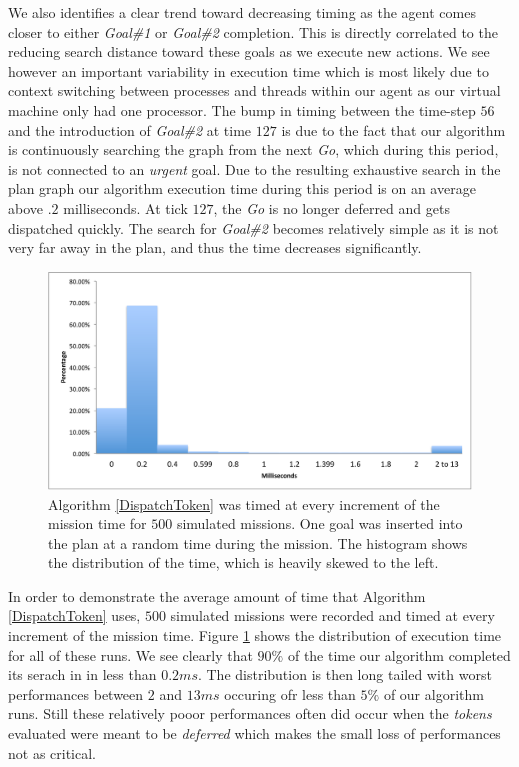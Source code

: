 We also identifies a clear trend toward decreasing timing as 
the agent comes closer to either {\em Goal\#1} or {\em Goal\#2} 
completion. This is directly correlated to the reducing search
distance toward these goals as we execute new actions. 
We see however an important variability in execution time which is
most likely due to context switching between processes and threads 
within our agent as our virtual machine only had one processor. 
The bump in timing between the time-step $56$ and the introduction of
{\em Goal\#2} at time $127$ is due to the fact that our algorithm is
continuously searching the graph from the next {\em Go}, which during
this period, is not connected to an {\em urgent} goal. Due to the
resulting exhaustive search in the plan graph our algorithm execution
time during this period is on an average above $.2$
milliseconds. At tick $127$, the {\em Go} is no longer deferred and gets
dispatched quickly. The search for {\em Goal\#2} becomes relatively simple as it is
not very far away in the plan, and thus the time decreases
significantly.

\begin{figure}[!htbp]
  \centering
  \includegraphics[width=\columnwidth]{figs/HistogramAlg1}
  \caption{\small Algorithm \ref{DispatchToken} was 
  timed at every increment of the mission time for $500$ 
  simulated missions. One goal was inserted into the plan 
  at a random time during the mission. The histogram shows 
  the distribution of the time, which is heavily skewed to the left.}
  \label{fig:histogram}
\end{figure}

In order to demonstrate the average amount of time that Algorithm
\ref{DispatchToken} uses, $500$ simulated missions were recorded and timed
at every increment of the mission time. Figure \ref{fig:histogram}
shows the distribution of execution time for all of these runs. We see
clearly that $90\%$ of the time our algorithm completed its serach in
in less than $0.2 ms$. The distribution is then long tailed with worst
performances between $2$ and $13ms$ occuring ofr less than $5\%$ of our
algorithm runs. Still these relatively pooor performances often did occur
when the {\em tokens} evaluated were meant to be {\em deferred} which
makes the small loss of performances not as critical.

